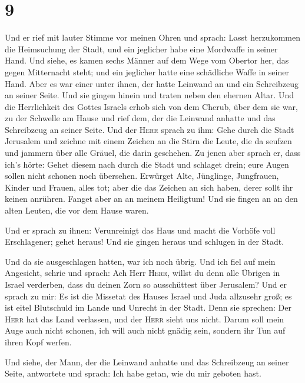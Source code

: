 \hypertarget{section-8}{%
\section{9}\label{section-8}}

 Und er rief mit lauter Stimme vor meinen Ohren und
sprach: Lasst herzukommen die Heimsuchung der Stadt, und ein jeglicher
habe eine Mordwaffe in seiner Hand.  Und siehe, es kamen
sechs Männer auf dem Wege vom Obertor her, das gegen Mitternacht steht;
und ein jeglicher hatte eine schädliche Waffe in seiner Hand. Aber es
war einer unter ihnen, der hatte Leinwand an und ein Schreibzeug an
seiner Seite. Und sie gingen hinein und traten neben den ehernen Altar.
 Und die Herrlichkeit des Gottes Israels erhob sich von
dem Cherub, über dem sie war, zu der Schwelle am Hause und rief dem, der
die Leinwand anhatte und das Schreibzeug an seiner Seite. 
Und der \textsc{Herr} sprach zu ihm: Gehe durch die Stadt Jerusalem und
zeichne mit einem Zeichen an die Stirn die Leute, die da seufzen und
jammern über alle Gräuel, die darin geschehen.  Zu jenen
aber sprach er, dass ich's hörte: Gehet diesem nach durch die Stadt und
schlaget drein; eure Augen sollen nicht schonen noch übersehen.
 Erwürget Alte, Jünglinge, Jungfrauen, Kinder und Frauen,
alles tot; aber die das Zeichen an sich haben, derer sollt ihr keinen
anrühren. Fanget aber an an meinem Heiligtum! Und sie fingen an an den
alten Leuten, die vor dem Hause waren.

 Und er sprach zu ihnen: Verunreinigt das Haus und macht
die Vorhöfe voll Erschlagener; gehet heraus! Und sie gingen heraus und
schlugen in der Stadt.

 Und da sie ausgeschlagen hatten, war ich noch übrig. Und
ich fiel auf mein Angesicht, schrie und sprach: Ach Herr \textsc{Herr},
willst du denn alle Übrigen in Israel verderben, dass du deinen Zorn so
ausschüttest über Jerusalem?  Und er sprach zu mir: Es ist
die Missetat des Hauses Israel und Juda allzusehr groß; es ist eitel
Blutschuld im Lande und Unrecht in der Stadt. Denn sie sprechen: Der
\textsc{Herr} hat das Land verlassen, und der \textsc{Herr} sieht uns
nicht.  Darum soll mein Auge auch nicht schonen, ich will
auch nicht gnädig sein, sondern ihr Tun auf ihren Kopf werfen.

 Und siehe, der Mann, der die Leinwand anhatte und das
Schreibzeug an seiner Seite, antwortete und sprach: Ich habe getan, wie
du mir geboten hast.

